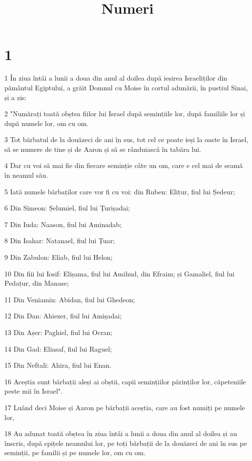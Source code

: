 

\title{Numeri}


\chapter{1}

\par 1 În ziua întâi a lunii a doua din anul al doilea după ieșirea Israeliților din pământul Egiptului, a grăit Domnul cu Moise în cortul adunării, în pustiul Sinai, și a zis:
\par 2 "Numărați toată obștea fiilor lui Israel după semințiile lor, după familiile lor și după numele lor, om cu om.
\par 3 Tot bărbatul de la douăzeci de ani în sus, tot cel ce poate ieși la oaste în Israel, să se numere de tine și de Aaron și să se rânduiască în tabăra lui.
\par 4 Dar cu voi să mai fie din fiecare seminție câte un om, care e cel mai de seamă în neamul său.
\par 5 Iată numele bărbaților care vor fi cu voi: din Ruben: Elițur, fiul lui Ședeur;
\par 6 Din Simeon: Șelumiel, fiul lui Țurișadai;
\par 7 Din Iuda: Naason, fiul lui Aminadab;
\par 8 Din Isahar: Natanael, fiul lui Țuar;
\par 9 Din Zabulon: Eliab, fiul lui Helon;
\par 10 Din fiii lui Iosif: Elișama, fiul lui Amihud, din Efraim; și Gamaliel, fiul lui Pedațur, din Manase;
\par 11 Din Veniamin: Abidan, fiul lui Ghedeon;
\par 12 Din Dan: Ahiezer, fiul lui Amișadai;
\par 13 Din Așer: Paghiel, fiul lui Ocran;
\par 14 Din Gad: Eliasaf, fiul lui Raguel;
\par 15 Din Neftali: Ahira, fiul lui Enan.
\par 16 Aceștia sunt bărbații aleși ai obștii, capii semințiilor părinților lor, căpeteniile peste mii în Israel".
\par 17 Luând deci Moise și Aaron pe bărbații aceștia, care au fost numiți pe numele lor,
\par 18 Au adunat toată obștea în ziua întâi a lunii a doua din anul al doilea și au înscris, după spițele neamului lor, pe toți bărbații de la douăzeci de ani în sus pe seminții, pe familii și pe numele lor, om cu om.
